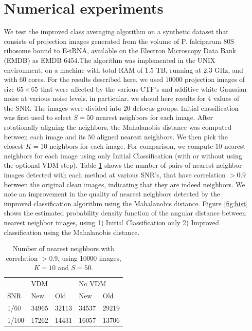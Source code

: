 \documentclass{article}
\begin{document}
\section{Numerical experiments}

We test the improved class averaging algorithm on a synthetic dataset that consists of projection images generated from the volume of P. falciparum 80S ribosome bound to E-tRNA, available on the Electron Microscopy Data Bank (EMDB) as EMDB 6454.The algorithm was implemented in the UNIX environment, on a machine with total RAM of 1.5 TB, running at 2.3 GHz, and with 60 cores. 
For the results described here, we used $10000$ projection images of size $65 \times 65$ that were affected by the various CTF's and additive white Gaussian noise at various noise levels, in particular, we shoud here results for 4 values of the SNR. The images were divided into $20$ defocus groups. Initial classification was first used to select $S=50$ nearest neighbors for each image. After rotationally aligning the neighbors, the Mahalanobis distance was computed between each image and its $50$ aligned nearest neighbors. We then pick the closest $K=10$ neighbors for each image. For comparison, we compute $10$ nearest neighbors for each image using only Initial Classification (with or without using the optional VDM step). Table \ref{table:1} shows the number of pairs of nearest neighbor images detected with each method at various SNR's, that have correlation $>0.9$ between the original clean images, indicating that they are indeed neighbors. We note an improvement in the quality of nearest neighbors detected by the improved classification algorithm using the Mahalanobis distance. Figure \ref{fig:hist} shows the estimated probability density function of the angular distance between nearest neighbor images, using 1) Initial Classification only 2) Improved classification using the Mahalanobis distance. 

\begin{table}[]
\centering
\caption{Number of nearest neighbors with correlation $>0.9$, 
using 10000 images, $K=10$ and $S=50$.
}
\label{table:1}
\begin{tabular}{lllll}
      & \multicolumn{2}{l}{VDM} & \multicolumn{2}{l}{No VDM} \\ \cline{2-5} 
SNR   & New        & Old        & New          & Old         \\ \cline{2-5} 
1/60  & 34965          & 32113          & 34537            & 29219       \\
1/100 & 17262      & 14431      & 16057        & 13706        \\ \cline{2-5} 
\end{tabular}
\end{table}
\end{document}
